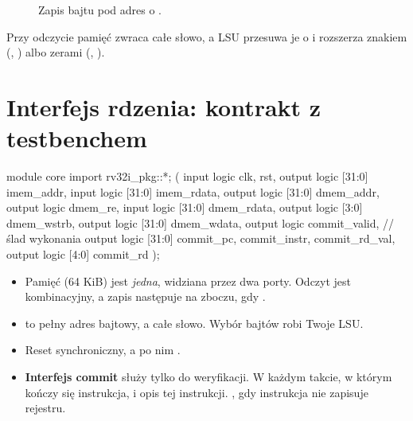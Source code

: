 \begin{figure}[h]
\centering
{}
\caption{Zapis bajtu pod adres o .}
\end{figure}

Przy odczycie pamięć zwraca całe słowo, a LSU przesuwa je o
 i rozszerza znakiem (, ) albo zerami
(, ).

\section{Interfejs rdzenia: kontrakt z testbenchem}

\begin{sv}
module core import rv32i_pkg::*; (
  input  logic        clk, rst,
  output logic [31:0] imem_addr,  input logic [31:0] imem_rdata,
  output logic [31:0] dmem_addr,  output logic dmem_re,
  input  logic [31:0] dmem_rdata,
  output logic [3:0]  dmem_wstrb, output logic [31:0] dmem_wdata,
  output logic        commit_valid,                    // ślad wykonania
  output logic [31:0] commit_pc, commit_instr, commit_rd_val,
  output logic [4:0]  commit_rd
);
\end{sv}

\begin{itemize}
  \item Pamięć (64 KiB) jest \emph{jedna}, widziana przez dwa porty. Odczyt jest
    kombinacyjny, a zapis następuje na zboczu, gdy .
  \item {} to pełny adres bajtowy, a  całe
    słowo. Wybór bajtów robi Twoje LSU.
  \item Reset synchroniczny, a po nim .
  \item \textbf{Interfejs commit} służy tylko do weryfikacji. W każdym takcie,
    w którym kończy się instrukcja,  i opis tej
    instrukcji. , gdy instrukcja nie zapisuje rejestru.
\end{itemize}

